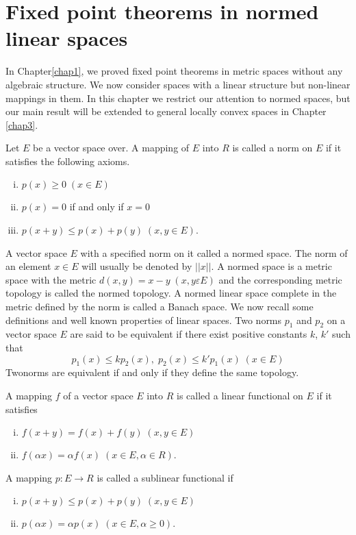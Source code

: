 \chapter{Fixed point theorems in normed linear spaces}\label{chap2}

In Chapter\pageoriginale \ref{chap1}, we proved fixed  point
theorems in 
metric spaces 
without any algebraic structure. We now consider spaces with a linear
structure but non-linear mappings in them. In this chapter we restrict
our attention to normed spaces, but our main result will be extended to
general locally convex spaces in Chapter \ref{chap3}. 

\begin{Definition}%
  Let $E$ be a vector space over. A mapping of $E$ into $R$ is called
  a norm on $E$ if it satisfies the following axioms. 
\end{Definition}

\begin{enumerate}[i)]
\item $p(x) \geq 0 \; (x \in E)$

\item $p(x) = 0$ if and only if $x=0$

\item $p(x+y) \leq p(x) + p(y) \; (x,y \in E)$.
\end{enumerate}

A vector space $E$ with a specified norm on it called a normed
space. The norm of an element $x \in E$ will usually be denoted by
$|| x||$. A normed space is a metric space with the metric $d(x,y)=
x-y \; (x,y \varepsilon E)$ and the corresponding metric topology is
called the 
normed topology. A normed linear space complete in the metric defined
by the norm is called a Banach space. We now recall some definitions
and well known properties of linear spaces. Two norms $p_1$ and $p_2$
on a vector  space $E$ are said to be equivalent if there exist
positive constants $k$, $k'$ such that 
$$
p_1 (x) \leq k p_2 (x) , \; p_2 (x) \leq k' p_1 (x)\; (x \in E)
$$
Two\pageoriginale norms are equivalent if and only if they define the
same topology. 

\begin{Definition}%
  A mapping $f$ of a vector space $E$ into $R$ is called a linear
  functional on $E$ if it satisfies 
\begin{enumerate}[i)]
\item $f(x+y) = f(x) + f(y)\; (x,y \in E)$

\item $f (\alpha x)  = \alpha f (x) \; (x \in E, \alpha\in R )$. 
\end{enumerate}

\noindent
A mapping $p : E \to R$ is called a sublinear functional if 

\begin{enumerate}[i)$'$]
\item $p (x + y ) \leq p(x) + p(y) \; (x,y \in E)$

\item $p(\alpha x ) = \alpha p (x) \; (x \in E, \alpha \geq 0)$.
\end{enumerate}
\end{Definition}

